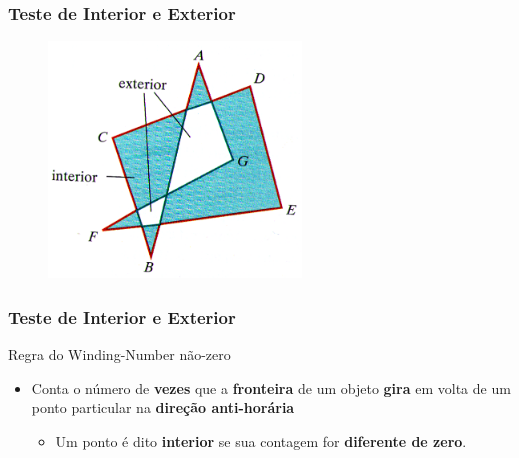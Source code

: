 \documentclass{beamer}
\begin{document}
\begin{frame}
\frametitle{Teste de Interior e Exterior}

		\begin{figure}[!h]
			\begin{center}
				\includegraphics[width=0.6\textwidth]{Figures/IntPol}
			\end{center}
		\end{figure}
	
\end{frame}

\begin{frame}
\frametitle{Teste de Interior e Exterior}

		\begin{block}{Regra do Winding-Number não-zero}
		\begin{itemize}
			\item Conta o número de \textbf{vezes} que a \textbf{fronteira} de um objeto \textbf{gira} em volta de um ponto particular na \textbf{direção anti-horária}
			\begin{itemize}
				\item Um ponto é dito \textbf{interior} se sua contagem for \textbf{diferente de zero}.
			\end{itemize}			 
		\end{itemize}
		\end{block}
	
\end{frame}
\end{document}
